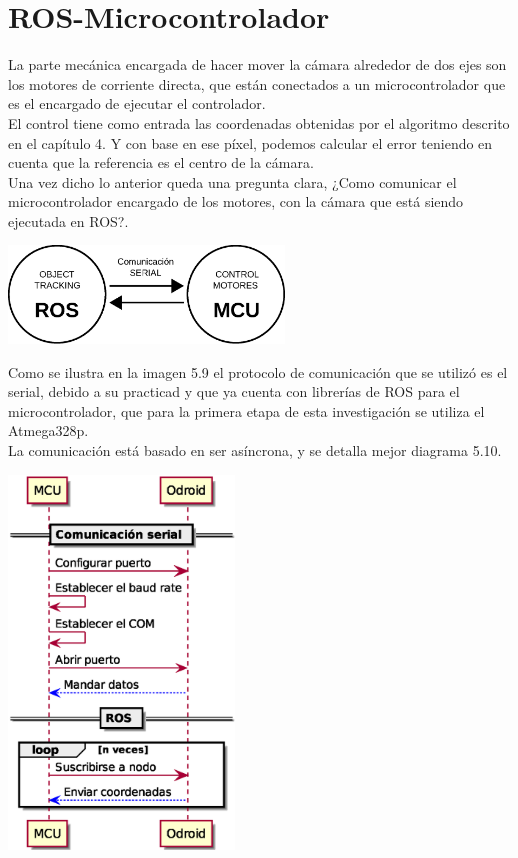 \section{ROS-Microcontrolador}
La parte mecánica encargada de hacer mover la cámara alrededor de dos ejes son los motores de corriente directa, que están conectados
a un microcontrolador que es el encargado de ejecutar el controlador.\\
El control tiene como entrada las coordenadas obtenidas por el algoritmo descrito en el capítulo 4. Y con base en ese píxel, podemos
calcular el error teniendo en cuenta que la referencia es el centro de la cámara.\\
Una vez dicho lo anterior queda una pregunta clara, ¿Como comunicar el microcontrolador encargado de los motores, con la cámara que
está siendo ejecutada en ROS?.
\begin{center}
	\includegraphics[width=0.55\textwidth]{Contenido/Cuerpo/Capitulo5/Fig1.eps}
	\label{Fig2}
\end{center}
Como se ilustra en la imagen 5.9 el protocolo de comunicación que se utilizó es el serial, debido a su practicad y que ya
cuenta con librerías de ROS para el microcontrolador, que para la primera etapa de esta investigación se utiliza el Atmega328p.\\
La comunicación está basado en ser asíncrona, y se detalla mejor diagrama 5.10.
\begin{center}
	\includegraphics[width=0.45\textwidth]{Contenido/Cuerpo/Capitulo5/Fig2.eps}
	\label{Fig3}
\end{center}
